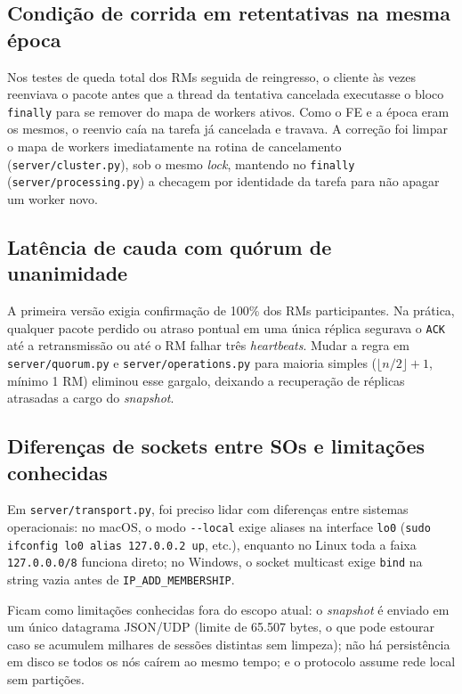 \documentclass[12pt]{article}
\begin{document}
\subsection{Condição de corrida em retentativas na mesma época}

Nos testes de queda total dos RMs seguida de reingresso, o cliente às vezes reenviava o pacote antes que a thread da tentativa cancelada executasse o bloco \texttt{finally} para se remover do mapa de workers ativos. Como o FE e a época eram os mesmos, o reenvio caía na tarefa já cancelada e travava. A correção foi limpar o mapa de workers imediatamente na rotina de cancelamento (\texttt{server/cluster.py}), sob o mesmo \textit{lock}, mantendo no \texttt{finally} (\texttt{server/processing.py}) a checagem por identidade da tarefa para não apagar um worker novo.

\subsection{Latência de cauda com quórum de unanimidade}

A primeira versão exigia confirmação de 100\% dos RMs participantes. Na prática, qualquer pacote perdido ou atraso pontual em uma única réplica segurava o \texttt{ACK} até a retransmissão ou até o RM falhar três \textit{heartbeats}. Mudar a regra em \texttt{server/quorum.py} e \texttt{server/operations.py} para maioria simples ($\lfloor n/2 \rfloor + 1$, mínimo 1 RM) eliminou esse gargalo, deixando a recuperação de réplicas atrasadas a cargo do \textit{snapshot}.

\subsection{Diferenças de sockets entre SOs e limitações conhecidas}

Em \texttt{server/transport.py}, foi preciso lidar com diferenças entre sistemas operacionais: no macOS, o modo \texttt{-{-}local} exige aliases na interface \texttt{lo0} (\texttt{sudo ifconfig lo0 alias 127.0.0.2 up}, etc.), enquanto no Linux toda a faixa \texttt{127.0.0.0/8} funciona direto; no Windows, o socket multicast exige \texttt{bind} na string vazia antes de \texttt{IP\_ADD\_MEMBERSHIP}.

Ficam como limitações conhecidas fora do escopo atual: o \textit{snapshot} é enviado em um único datagrama JSON/UDP (limite de 65.507 bytes, o que pode estourar caso se acumulem milhares de sessões distintas sem limpeza); não há persistência em disco se todos os nós caírem ao mesmo tempo; e o protocolo assume rede local sem partições.
\end{document}

